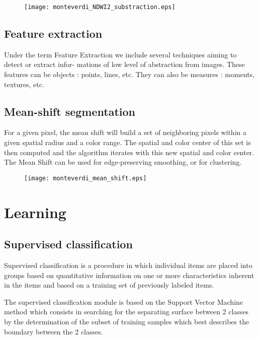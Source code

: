 \documentclass{InsightSoftwareGuide}
\begin{document}
\begin{figure}
   \center
   \texttt{[image: monteverdi\_NDWI2\_substraction.eps]}
   \label{fig:ndwi2}
\end{figure}

\subsection{Feature extraction}

Under the term Feature Extraction we include several techniques aiming to detect or extract infor-
mations of low level of abstraction from images. These features can be objects : points, lines, etc.
They can also be measures : moments, textures, etc.

\subsection{Mean-shift segmentation}

For a given pixel, the mean shift will build a set of neighboring pixels within a given 
spatial radius and a color range. The spatial and color center of this set is then 
computed and the algorithm iterates with this new spatial and
color center. The Mean Shift can be used for edge-preserving smoothing, or for clustering.

\begin{figure}
   \center
   \texttt{[image: monteverdi\_mean\_shift.eps]}
   \label{fig:meanshift}
\end{figure}

\section{Learning}
\subsection{Supervised classification}
Supervised classification is a procedure in which individual items are placed into 
groups based on quantitative information on one or more characteristics inherent 
in the items and based on a training set of previously labeled items.

The supervised classification module is based on the Support Vector Machine method
which consists in searching for the separating surface between 2 classes by
the determination of the subset of training samples which best describes the boundary between the 2
classes.
\end{document}
